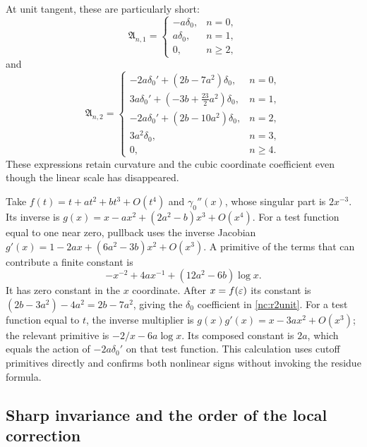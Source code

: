 At unit tangent, these are particularly short:
\begin{equation}\label{nc:r1unit}
 \mathfrak A_{n,1}=
 \begin{cases}
  -a\delta_0,&n=0,\\
  a\delta_0,&n=1,\\
  0,&n\geq2,
 \end{cases}
\end{equation}
and
\begin{equation}\label{nc:r2unit}
 \mathfrak A_{n,2}=
 \begin{cases}
  -2a\delta_0'+(2b-7a^2)\delta_0,&n=0,\\
  3a\delta_0'+(-3b+\tfrac{23}{2}a^2)\delta_0,&n=1,\\
  -2a\delta_0'+(2b-10a^2)\delta_0,&n=2,\\
  3a^2\delta_0,&n=3,\\
  0,&n\geq4.
 \end{cases}
\end{equation}
These expressions retain curvature and the cubic coordinate coefficient
even though the linear scale has disappeared.

\begin{example}
\label{nc:direct-cutoff}
Take $f(t)=t+a t^2+b t^3+O(t^4)$ and $\gamma_0''(x)$, whose singular
part is $2x^{-3}$. Its inverse is
$g(x)=x-a x^2+(2a^2-b)x^3+O(x^4)$. For a test function equal to one
near zero, pullback uses the inverse Jacobian
$g'(x)=1-2a x+(6a^2-3b)x^2+O(x^3)$.
A primitive of the terms that can contribute a finite constant is
\[
 -x^{-2}+4a x^{-1}+(12a^2-6b)\log x.
\]
It has zero constant in the $x$ coordinate. After $x=f(\varepsilon)$ its
constant is $(2b-3a^2)-4a^2=2b-7a^2$, giving the $\delta_0$
coefficient in \eqref{nc:r2unit}. For a test function equal to $t$,
the inverse multiplier is $g(x)g'(x)=x-3a x^2+O(x^3)$; the relevant
primitive is $-2/x-6a\log x$. Its composed constant is $2a$, which
equals the action of $-2a\delta_0'$ on that test function.
This calculation uses cutoff primitives directly and confirms both
nonlinear signs without invoking the residue formula.
\end{example}

\subsection{Sharp invariance and the order of the local correction}

